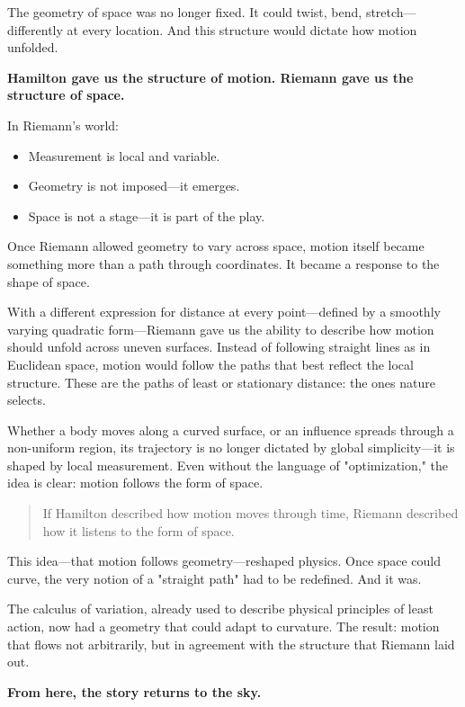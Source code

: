 The geometry of space was no longer fixed. It could twist, bend, stretch—differently at every location. And this structure would dictate how motion unfolded.

\textbf{Hamilton gave us the structure of motion. Riemann gave us the structure of space.}

In Riemann’s world:
\begin{itemize}
  \item Measurement is local and variable.
  \item Geometry is not imposed—it emerges.
  \item Space is not a stage—it is part of the play.
\end{itemize}

Once Riemann allowed geometry to vary across space, motion itself became something more than a path through coordinates. It became a response to the shape of space.

With a different expression for distance at every point—defined by a smoothly varying quadratic form—Riemann gave us the ability to describe how motion should unfold across uneven surfaces. Instead of following straight lines as in Euclidean space, motion would follow the paths that best reflect the local structure. These are the paths of least or stationary distance: the ones nature selects.

Whether a body moves along a curved surface, or an influence spreads through a non-uniform region, its trajectory is no longer dictated by global simplicity—it is shaped by local measurement. Even without the language of "optimization," the idea is clear: motion follows the form of space.

\begin{quote}
If Hamilton described how motion moves through time,  
Riemann described how it listens to the form of space.
\end{quote}

This idea—that motion follows geometry—reshaped physics. Once space could curve, the very notion of a "straight path" had to be redefined. And it was.

The calculus of variation, already used to describe physical principles of least action, now had a geometry that could adapt to curvature. The result: motion that flows not arbitrarily, but in agreement with the structure that Riemann laid out.

\textbf{From here, the story returns to the sky.}
